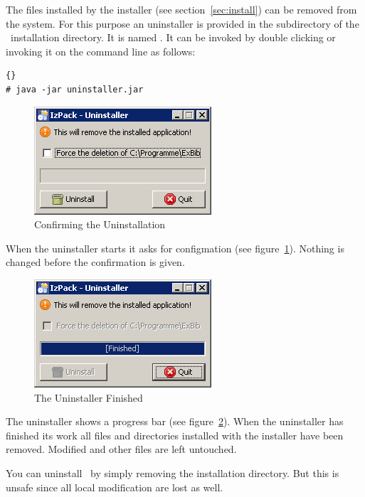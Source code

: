The files installed by the installer (see section~\ref{sec:install})
can be removed from the system. For this purpose an uninstaller is
provided in the subdirectory  of the \ExBib\
installation directory. It is named . It can be
invoked by double clicking or invoking it on the command line as follows:

\begin{lstlisting}{}
# java -jar uninstaller.jar
\end{lstlisting}

\begin{figure}[!ht]
  \centering
  \includegraphics[width=.45\textwidth]{img/uninst1}
  \caption{Confirming the Uninstallation}
  \label{fig:uninst1}
\end{figure}

When the uninstaller starts it asks for configmation (see
figure~\ref{fig:uninst1}). Nothing is changed before the confirmation
is given.

\begin{figure}[!ht]
  \centering
  \includegraphics[width=.45\textwidth]{img/uninst2}
  \caption{The Uninstaller Finished}
  \label{fig:uninst2}
\end{figure}

The uninstaller shows a progress bar (see figure~\ref{fig:uninst2}).
When the uninstaller has finished its work all files and directories
installed with the installer have been removed. Modified and other
files are left untouched.

You can uninstall \ExBib\ by simply removing the installation
directory.%
 But
this is unsafe since all local modification are lost as well.



\endinput
%
